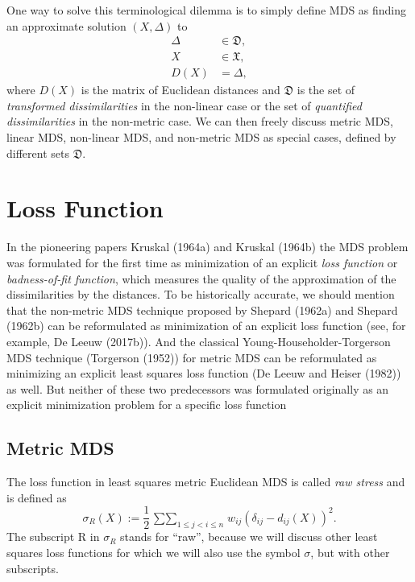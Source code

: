 \documentclass[
  12pt,
]{article}
\begin{document}
One way to solve this terminological dilemma is to simply define
MDS as finding an approximate solution \((X,\Delta)\) to
\begin{subequations}
\begin{align}
\Delta&\in\mathfrak{D}\label{eq:gmdsdef1},\\
X&\in\mathfrak{X}\label{eq:gmdsdef2},\\
D(X)&=\Delta\label{eq:gmdsdef3},
\end{align}
\end{subequations}
where \(D(X)\) is the matrix of Euclidean distances and \(\mathfrak{D}\) is the set of \emph{transformed dissimilarities} in the non-linear case or the set of \emph{quantified dissimilarities} in the non-metric case. We can then freely discuss
metric MDS, linear MDS, non-linear MDS, and non-metric MDS as special cases,
defined by different sets \(\mathfrak{D}\).

\section{Loss Function}\label{loss-function}

In the pioneering papers Kruskal (1964a) and Kruskal (1964b) the MDS problem
was formulated for the first time as minimization of an explicit \emph{loss
function} or \emph{badness-of-fit function}, which measures the quality of the approximation of the dissimilarities by the distances. To be historically accurate, we should
mention that the non-metric MDS technique proposed by Shepard (1962a) and Shepard (1962b) can be reformulated as minimization of an explicit loss function (see, for example, De Leeuw (2017b)). And the classical Young-Householder-Torgerson MDS technique (Torgerson (1952)) for metric MDS can be reformulated as minimizing an explicit least squares loss function (De Leeuw and Heiser (1982)) as well.
But neither of these two predecessors was formulated originally as an explicit minimization
problem for a specific loss function

\subsection{Metric MDS}\label{metric-mds}

The loss function in least squares
metric Euclidean MDS is called \emph{raw stress}
and is defined as
\begin{equation}
\sigma_R(X):=\frac12\mathop{\sum\sum}_{1\leq j<i\leq n}w_{ij}(\delta_{ij}-d_{ij}(X))^2.
\label{eq:stressdef}
\end{equation}
The subscript R in \(\sigma_R\) stands for ``raw'', because we will discuss
other least squares loss functions for which we will also use the
symbol \(\sigma\), but with other subscripts.
\end{document}
